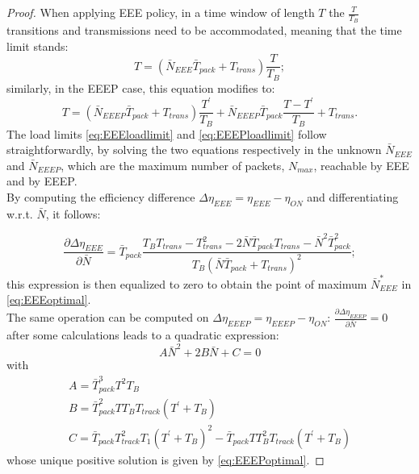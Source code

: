 \documentclass[journal,10pt,twoside,final]{IEEEtran}
\begin{document}
\begin{proof}
When applying EEE policy, in a time window of length $T$ the $\frac{T}{T_B}$ transitions and transmissions need to be accommodated, meaning that the time limit stands: 
\begin{equation}
T=\left(\bar{N}_{EEE} \bar{T}_{pack}+T_{trans}\right)\frac{T}{T_B};
\end{equation}
similarly, in the EEEP case, this equation modifies to:
\begin{equation}
T=\left(\bar{N}_{EEEP} \bar{T}_{pack}+T_{trans}\right)\frac{T^\prime}{T_B} + \bar{N}_{EEEP} \bar{T}_{pack}\frac{T-T^\prime}{T_B}+T_{trans}.
\end{equation}
The load limits \eqref{eq:EEEloadlimit} and \eqref{eq:EEEPloadlimit} follow straightforwardly, by solving the two equations respectively in the unknown $\bar{N}_{EEE}$ and $\bar{N}_{EEEP}$, which are the maximum number of packets, $N_{max}$, reachable by EEE and by EEEP.\\
By computing the efficiency difference $\Delta\eta_{EEE}=\eta_{EEE}-\eta_{ON}$ and differentiating w.r.t. $\bar{N}$, it follows:

\begin{equation}
\frac{\partial\Delta\eta_{EEE}}{\partial \bar{N}}=\bar{T}_{pack}\frac{T_B T_{trans} - T_{trans}^2-2\bar{N}\bar{T}_{pack} T_{trans}-\bar{N}^2 \bar{T}_{pack}^2}{T_B \left(\bar{N}\bar{T}_{pack}+T_{trans}\right)^2};
\end{equation}
this expression is then equalized to zero to obtain the point of maximum $\bar{N}_{EEE}^\ast$ in \eqref{eq:EEEoptimal}.\\
The same operation can be computed on $\Delta\eta_{EEEP}=\eta_{EEEP}-\eta_{ON}$: $\frac{\partial\Delta\eta_{EEEP}}{\partial \bar{N}}=0$ after some calculations leads to a quadratic expression:
\begin{equation}
A\bar{N}^2+2B\bar{N}+C=0
\end{equation}
with
\begin{equation}
\begin{array}{l} 
	A=\bar{T}_{pack}^3 T^2 T_B \\ 
	B= \bar{T}_{pack}^2TT_BT_{track}\left(T^\prime+T_B\right)\\ 
	C= \bar{T}_{pack}T_{track}^2T_1\left(T^\prime+T_B\right)^2-\bar{T}_{pack}T T_B^2T_{track}\left(T^\prime+T_B\right)
\end{array}
\nonumber
\end{equation}
whose unique positive solution is given by \eqref{eq:EEEPoptimal}.
\end{proof}
\end{document}
